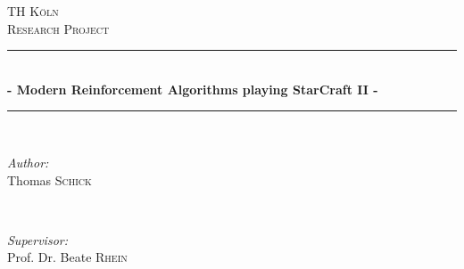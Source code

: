 \begin{titlepage}

    \newcommand{\HRule}{\rule{\linewidth}{0.5mm}} %
    
    \center %
    
    \begin{flushright}
    \end{flushright}
    \vspace{1.5cm}
    
    \textsc{\LARGE TH Köln}\\[1.5cm] %
    \textsc{\Large Research Project}\\[0.5cm] %
    
    
    \HRule \\[0.4cm]
    { \huge \bfseries
      - Modern Reinforcement Algorithms playing StarCraft II -}\\[0.4cm] %
    \HRule \\[1.5cm]
     
    
    \begin{minipage}{0.4\textwidth}
    \begin{flushleft} \large
    \emph{Author:}\\
    Thomas \textsc{Schick\\} %
    \end{flushleft}
    \end{minipage}
    ~
    \begin{minipage}{0.4\textwidth}
    \begin{flushright} \large
    \emph{
    Supervisor:} \\
    Prof. Dr. Beate \textsc{Rhein} \\ %
    \end{flushright}
    \end{minipage}\\[9cm]
    

\end{titlepage}
